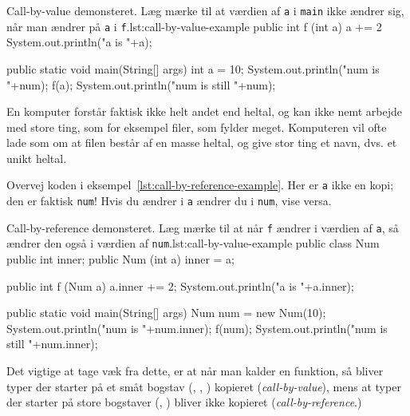         \begin{JavaCode}{Call-by-value demonsteret. Læg mærke til at værdien af \texttt{a} i \texttt{main} ikke ændrer sig, når man ændrer på \texttt{a} i \texttt{f}.}{lst:call-by-value-example}
            public int f (int a) {
                a += 2
                System.out.println("a is "+a);
            }

            public static void main(String[] args) {
                int a = 10;
                System.out.println("num is "+num);
                f(a);
                System.out.println("num is still "+num);
            }
        \end{JavaCode}

        En komputer forstår faktisk ikke helt andet end heltal, og kan
        ikke nemt arbejde med store ting, som for eksempel filer, som
        fylder meget. Komputeren vil ofte lade som om at filen består
        af en masse heltal, og give stor ting et navn, dvs. et unikt
        heltal.

        Overvej koden i eksempel~\ref{lst:call-by-reference-example}.
        Her er \texttt{a} ikke en kopi; den er faktisk \texttt{num}! Hvis
        du ændrer i \texttt{a} ændrer du i \texttt{num}, vise versa.

        \begin{JavaCode}{Call-by-reference demonsteret. Læg mærke til at når \texttt{f} ændrer i værdien af \texttt{a}, så ændrer den også i værdien af \texttt{num}.}{lst:call-by-value-example}
            public class Num {
                public int inner;
                public Num (int a) { inner = a; }
            }

            public int f (Num a) {
                a.inner += 2;
                System.out.println("a is "+a.inner);
            }

            public static void main(String[] args) {
                Num num = new Num(10);
                System.out.println("num is "+num.inner);
                f(num);
                System.out.println("num is still "+num.inner);
            }
        \end{JavaCode}

        Det vigtige at tage væk fra dette, er at når man kalder en
        funktion, så bliver typer der starter på et småt bogstav
        (, , ) kopieret
        (\emph{call-by-value}), mens at typer der starter på store
        bogstaver (, ) bliver ikke kopieret
        (\emph{call-by-reference}.)

